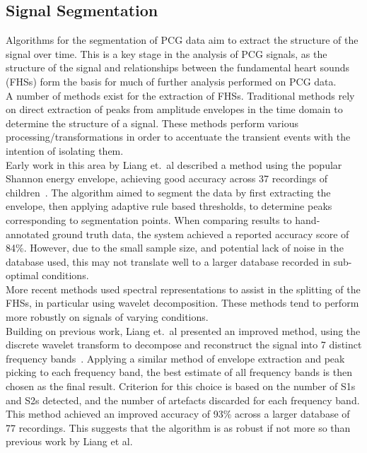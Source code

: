 \documentclass[titlepage, 12pt]{scrartcl} \usepackage{enumitem}
\begin{document}
\subsection{Signal Segmentation}\label{Segmentation}
Algorithms for the segmentation of PCG data aim to extract the structure of the
signal over time. This is a key stage in the analysis of PCG signals, as the
structure of the signal and relationships between the fundamental heart sounds
(FHSs) form the basis for much of further analysis performed on PCG data.\\


A number of methods exist for the extraction of FHSs. Traditional methods rely
on direct extraction of peaks from amplitude envelopes in the time domain to
determine the structure of a signal.  These methods perform various
processing/transformations in order to accentuate the transient events with the
intention of isolating them.\\
Early work in this area by Liang et.\ al described a method using the popular
Shannon energy envelope, achieving good accuracy across 37 recordings of
children~\parencite{Liang1997b}. The algorithm aimed to segment the data by
first extracting the envelope, then applying adaptive rule based thresholds, to
determine peaks corresponding to segmentation points. When comparing results to
hand-annotated ground truth data, the system achieved a reported accuracy score
of 84\%. However, due to the small sample size, and potential lack of noise in
the database used, this may not translate well to a larger database recorded in
sub-optimal conditions.\\
More recent methods used spectral representations to assist in the splitting of
the FHSs, in particular using wavelet decomposition. These methods tend to
perform more robustly on signals of varying conditions.\\
Building on previous work, Liang et.\ al presented an improved method, using the
discrete wavelet transform to decompose and reconstruct the signal into 7
distinct frequency bands~\parencite{Liang1997a}. Applying a similar method
of envelope extraction and peak picking to each frequency band, the best
estimate of all frequency bands is then chosen as the final result. Criterion
for this choice is based on the number of S1s and S2s detected, and the number
of artefacts discarded for each frequency band. This method achieved an
improved accuracy of 93\% across a larger database of 77 recordings. This
suggests that the algorithm is as robust if not more so than previous work by
Liang et al.\\
\end{document}
